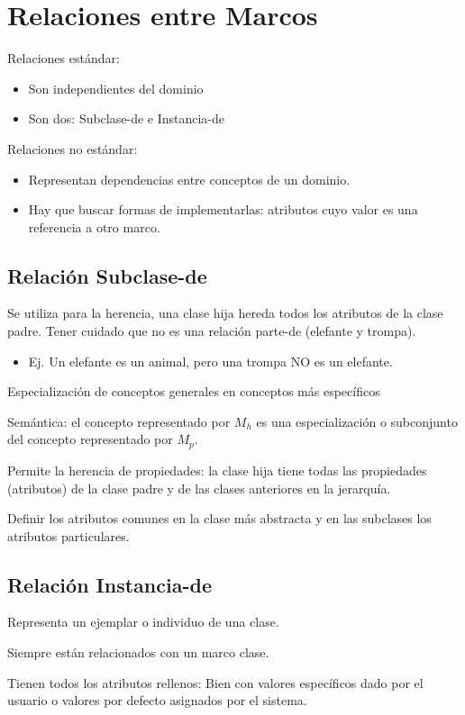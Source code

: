 \documentclass[12pt, twoside, openright]{report} %
\begin{document}
\section{Relaciones entre Marcos}
Relaciones estándar:
\begin{itemize}
	\item Son independientes del dominio 
	\item Son dos: Subclase-de e Instancia-de
\end{itemize}
Relaciones no estándar:
\begin{itemize}
	\item Representan dependencias entre conceptos de un dominio.
	\item Hay que buscar formas de implementarlas: atributos cuyo valor es una referencia a otro marco.
\end{itemize}

\subsection{Relación Subclase-de}
Se utiliza para la herencia, una clase hija hereda todos los atributos de la clase padre. Tener cuidado que no es una relación parte-de (elefante y trompa).
\begin{itemize}
	\item Ej. Un elefante es un animal, pero una trompa NO es un elefante.
\end{itemize}

Especialización de conceptos generales en conceptos más específicos

Semántica: el concepto representado por $M_h$ es una especialización o subconjunto del concepto representado por $M_p$. 

Permite la herencia de propiedades: la clase hija tiene todas las propiedades (atributos) de la clase padre y de las clases anteriores en la jerarquía.

Definir los atributos comunes en la clase más abstracta y en las subclases los atributos particulares.

\subsection{Relación Instancia-de}
Representa un ejemplar o individuo de una clase.

Siempre están relacionados con un marco clase.

Tienen todos los atributos rellenos: Bien con valores específicos dado por el usuario o  valores por defecto asignados por el sistema.
\end{document}
